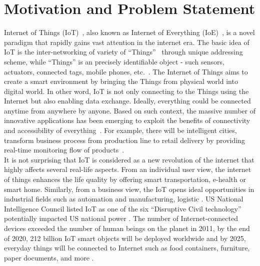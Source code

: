 \section{Motivation and Problem Statement}

Internet of Things (IoT)~, also known as Internet of Everything (IoE)~, is a novel paradigm that rapidly gains vast attention in the internet era. The basic idea of IoT is the inter-networking of variety of ``Things''~ through unique addressing scheme, while ``Things'' is an precisely identifiable object - such sensors, actuators, connected tags, mobile phones, etc.~\cite{atzori2010internet}\cite{bassi2008internet}. 
The Internet of Things aims to create a smart environment by bringing the Things from physical world into digital world. In other word, IoT is not only connecting to the Things using the Internet but also enabling data exchange. Ideally, everything could be connected anytime from anywhere by anyone. Based on such context, the massive number of innovative applications has been emerging to exploit the benefits of connectivity and accessibility of everything~\cite{vermesan2013internet}. For example, there will be intelligent cities, transform business process from production line to retail delivery by providing real-time monitoring flow of products~\cite{lee2015internet}.\\

It is not surprising that IoT is considered as a new revolution of the internet that highly affects several real-life aspects. From an individual user view, the internet of things enhances the life quality by offering smart transportation, e-health or smart home. Similarly, from a business view, the IoT opens ideal opportunities in industrial fields such as automation and manufacturing, logistic \cite{2010}. US National Intelligence Council listed IoT as one of the six ``Disruptive Civil technology'' potentially impacted US national power \cite{intelligence2008six}. The number of Internet-connected devices exceeded the number of human beings on the planet in 2011, by the end of 2020, 212 billion IoT smart objects will be deployed worldwide and by 2025, everyday things will be connected to Internet such as food containers, furniture, paper documents, and more \cite{floyer2013defining}\cite{TheInter38:online}.\\

